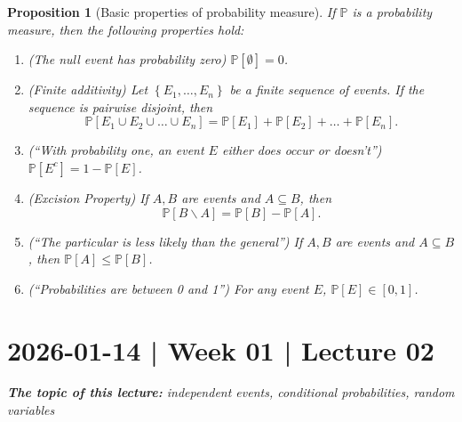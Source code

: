\documentclass[10pt]{article}
\newtheorem{proposition}[theorem]{Proposition}
\theoremstyle{definition}
\newcommand{\1}[1]{\textbf{1}_{\left[#1\right]}} %
\def\P{\mathbb{P}} %
\begin{document}
\begin{proposition}[Basic properties of probability measure]
  \label{prop:some-deductions-from-axioms}
  If $\P$ is a probability measure, then the following properties hold:
  \begin{enumerate}[label=\rm{(\roman*.)}]
    \item (The null event has probability zero) \label{item:empty-set-has-prob-zero}
    $\P\left[\emptyset \right] = 0$.
    \item (Finite additivity) \label{item:finite-additivity} Let $\left\{E_{1},\ldots,E_{n}\right\}$ be a
    \textit{finite} sequence of events. If the sequence is pairwise disjoint, then
    \begin{equation*}
      \P\left[E_{1}\cup E_{2}\cup\ldots\cup E_{n} \right] 
      = \P\left[E_{1} \right]+\P\left[E_{2} \right]+\ldots+\P\left[E_{n} \right].
    \end{equation*}
    \item (``With probability one, an event $E$ either does occur or doesn't'') \label{item:complements} $\P\left[E^{c} \right] = 1-\P\left[E \right]$.
    \item (Excision Property) \label{item:excision-property} If $A,B$ are events and $A\subseteq B$, then
    \begin{equation*}
      \P\left[B\backslash A \right] = \P\left[B \right] - \P\left[A \right].
    \end{equation*}
    \item (``The particular is less likely than the general'') \label{item:subsets} If $A,B$ are events and $A\subseteq B$, then
    $\P\left[ A\right] \leq \P\left[B \right]$.
    \item (``Probabilities are between 0 and 1'') \label{item:probabilities-are-in-unit-interval} For any event $E$,  $\P\left[E \right]\in [0,1]$.
  \end{enumerate}
\end{proposition}

\section{2026-01-14 | Week 01 | Lecture 02}
\begin{center}
  \begin{tcolorbox}[width=0.9\textwidth, colback=white, colframe=black]
    \textit{\textbf{The topic of this lecture:} independent events, conditional
      probabilities, random variables}
  \end{tcolorbox}
\end{center}
\end{document}
